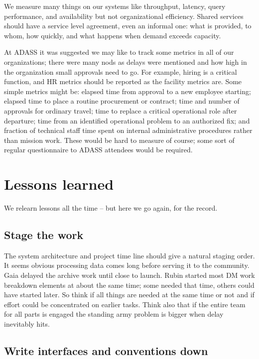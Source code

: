We measure many things on our systems like throughput, latency, query performance, and availability but not organizational efficiency.
Shared services should have a service level agreement, even an informal one: what is provided, to whom, how quickly, and what happens when demand exceeds capacity.

At ADASS it was suggested we may like to track some metrics in all of our organizations; there were many nods as delays were mentioned
and how high in the organization small approvals need to go. For example, hiring is a critical function, and HR metrics should be reported as the facility metrics are.
Some simple metrics might be:
elapsed time from approval to a new employee starting;
elapsed time to place a routine procurement or contract;
time and number of approvals for ordinary travel;
time to replace a critical operational role after departure;
time from an identified operational problem to an authorized fix; and
fraction of technical staff time spent on internal administrative procedures rather than mission work.
These would be hard to measure of course; some sort of regular questionnaire to ADASS attendees would be required.



\section{Lessons learned}
\label{sec:lessons}

We relearn lessons all the time -- but here we go again, for the record.

\subsection{Stage the work}

The system architecture and project time line should give a natural staging order.
It seems obvious processing data comes long before serving it to the community.
Gaia delayed the archive work until close to launch.
Rubin started most DM work breakdown elements at about the same time; some needed that time, others could have started later.
So think if all things are needed at the same time or not and if effort could be concentrated on earlier tasks.
Think also that if the entire team for all parts is engaged the standing army problem is bigger when delay
inevitably hits.

\subsection{Write interfaces and conventions down}

